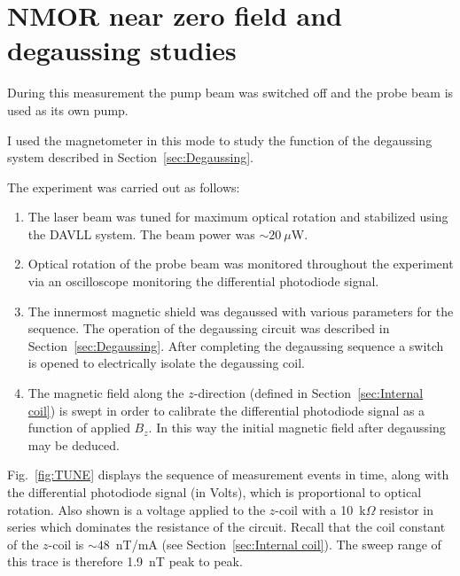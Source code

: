 \section{NMOR near zero field and degaussing studies\label{sec:near zero field}}

During this measurement the pump beam was switched off and the probe
beam is used as its own pump.

I used the magnetometer in this mode to study the function of the
degaussing system described in
Section~\ref{sec:Degaussing}.

The experiment was carried out as follows:
\begin{enumerate}
\item The laser beam was tuned for maximum optical rotation and
  stabilized using the DAVLL system.  The beam power was $\sim
  20~\mu$W.
\item Optical rotation of the probe beam was monitored throughout the
  experiment via an oscilloscope monitoring the differential
  photodiode signal.
\item The innermost magnetic shield was degaussed with various
  parameters for the sequence.  The operation of the degaussing
  circuit was described in Section~\ref{sec:Degaussing}.  After
  completing the degaussing sequence a switch is opened to
  electrically isolate the degaussing coil.
\item The magnetic field along the $z$-direction (defined in
  Section~\ref{sec:Internal coil}) is swept in order to calibrate the
  differential photodiode signal as a function of applied $B_z$.  In
  this way the initial magnetic field after degaussing may be deduced.
\end{enumerate}
Fig.~\ref{fig:TUNE} displays the sequence of measurement events in
time, along with the differential photodiode signal (in Volts), which
is proportional to optical rotation.  Also shown is a voltage applied
to the $z$-coil with a 10~k$\Omega$ resistor in series which dominates
the resistance of the circuit.  Recall that the coil constant of the
$z$-coil is $\sim 48$~nT/mA (see Section~\ref{sec:Internal coil}).
The sweep range of this trace is therefore
1.9~nT peak to peak.

